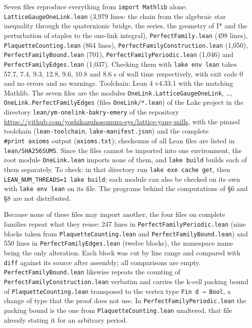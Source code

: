 \documentclass[11pt,a4paper]{article}
\theoremstyle{named}
\begin{document}
Seven files reproduce everything from \texttt{import\ \allowbreak{}Mathlib} alone: \texttt{LatticeGaugeOneLink.\allowbreak{}lean} (3,979 lines: the chain from the algebraic star inequality through the quaternionic bridge, the series, the geometry of I* and the perturbation of staples to the one-link integral), \texttt{PerfectFamily.\allowbreak{}lean} (498 lines), \texttt{PlaquetteCounting.\allowbreak{}lean} (864 lines), \texttt{PerfectFamilyConstruction.\allowbreak{}lean} (1,050), \texttt{PerfectFamilyBound.\allowbreak{}lean} (701), \texttt{PerfectFamilyPeriodic.\allowbreak{}lean} (1,046) and \texttt{PerfectFamilyEdges.\allowbreak{}lean} (1,037). Checking them with \texttt{lake\ \allowbreak{}env\ \allowbreak{}lean} takes 57.7, 7.4, 9.3, 12.8, 9.6, 10.8 and 8.6 s of wall time respectively, with exit code 0 and no errors and no warnings. Toolchain: Lean 4 v4.33.1 with the matching Mathlib. The seven files are the modules \texttt{OneLink.\allowbreak{}LatticeGaugeOneLink}, \dots, \texttt{OneLink.\allowbreak{}PerfectFamilyEdges} (files \texttt{OneLink/\allowbreak{}*.lean}) of the Lake project in the directory \texttt{lean/\allowbreak{}ym-onelink-bakry-emery} of the repository \url{https://github.com/yoshikazuhosomura-sys/lattice-yang-mills}, with the pinned toolchain (\texttt{lean-toolchain}, \texttt{lake-manifest.\allowbreak{}json}) and the complete \texttt{\#print\ \allowbreak{}axioms} output (\texttt{axioms.\allowbreak{}txt}); checksums of all Lean files are listed in \texttt{lean/\allowbreak{}SHA256SUMS}. Since the files cannot be imported into one environment, the root module \texttt{OneLink.\allowbreak{}lean} imports none of them, and \texttt{lake build} builds each of them separately. To check: in that directory run \texttt{lake exe cache get}, then \texttt{LEAN\_NUM\_THREADS=1 lake build}; each module can also be checked on its own with \texttt{lake env lean} on its file. The programs behind the computations of §6 and §8 are not distributed.

Because none of these files may import another, the four files on complete families repeat what they reuse: 247 lines in \texttt{PerfectFamilyPeriodic.\allowbreak{}lean} (nine blocks taken from \texttt{PlaquetteCounting.\allowbreak{}lean} and \texttt{PerfectFamilyBound.\allowbreak{}lean}) and 550 lines in \texttt{PerfectFamilyEdges.\allowbreak{}lean} (twelve blocks), the namespace name being the only alteration. Each block was cut by line range and compared with \texttt{diff} against its source after assembly; all comparisons are empty. \texttt{PerfectFamilyBound.\allowbreak{}lean} likewise repeats the counting of \texttt{PerfectFamilyConstruction.\allowbreak{}lean} verbatim and carries the k-cell packing bound of \texttt{PlaquetteCounting.\allowbreak{}lean} transposed to the vertex type \texttt{Fin\ \allowbreak{}d\ \allowbreak{}→\ \allowbreak{}Bool}, a change of type that the proof does not use. In \texttt{PerfectFamilyPeriodic.\allowbreak{}lean} the packing bound is the one from \texttt{PlaquetteCounting.\allowbreak{}lean} unaltered, that file already stating it for an arbitrary period.
\end{document}
